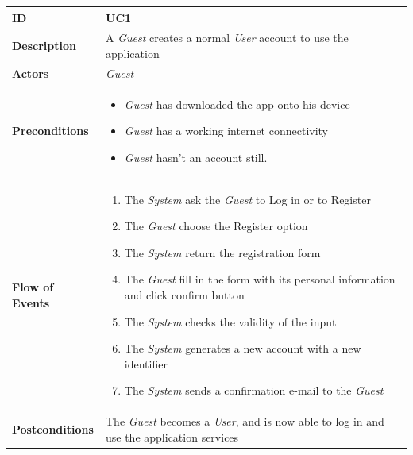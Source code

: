 \begin{table}[H]
\begin{tabular}{|l|p{}|}
\hline
\textbf{ID}             & UC1                                                                             \\ \hline
\textbf{Description}    & A \textit{Guest} creates a normal \textit{User} account to use the application \\ \hline
\textbf{Actors}         &   \textit{Guest}                                                                            \\ \hline

\textbf{Preconditions}  &   \begin{itemize}

 \item \textit{Guest} has downloaded the app onto his device
   \item      \textit{Guest} has a working internet connectivity
     \item       \textit{Guest} hasn't an account still.
                 \end{itemize}     
                    \\ \hline
                    
\textbf{Flow of Events} &   \begin{enumerate}
    \item The \textit{System} ask the \textit{Guest} to Log in or to Register
    \item The \textit{Guest} choose the Register option
    \item The \textit{System} return the registration form
    \item The \textit{Guest} fill in the form with its personal information and click confirm button
    \item The \textit{System} checks the validity of the input
    \item The \textit{System} generates a new account with a new identifier
    \item The \textit{System} sends a confirmation e-mail to the \textit{Guest}
\end{enumerate}                                                                             \\ \hline
\textbf{Postconditions} &  The \textit{Guest} becomes a \textit{User}, and is now able to log in and use the application services                                                                     \\ \hline


\end{tabular}
\end{table}

